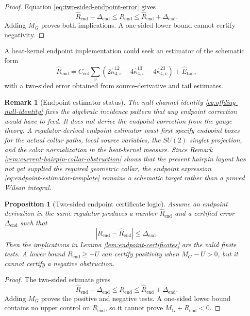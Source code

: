 \documentclass[11pt]{article}
\newtheorem{proposition}[theorem]{Proposition}
\newtheorem{remark}[theorem]{Remark}
\begin{document}
\begin{proof}
Equation \eqref{eq:two-sided-endpoint-error} gives
\[
  \widehat R_{\mathrm{end}}-\Delta_{\mathrm{end}}
  \le R_{\mathrm{end}}
  \le\widehat R_{\mathrm{end}}+\Delta_{\mathrm{end}}.
\]
Adding $M_G$ proves both implications.  A one-sided lower bound cannot certify negativity.
\end{proof}

A heat-kernel endpoint implementation could seek an estimator of the schematic form
\begin{equation}
  \widehat R_{\mathrm{end}}
  =C_{\mathrm{col}}
  \sum_v\left(
  2\widehat\kappa_{4,v}^{12}
  -4\widehat\kappa_{4,v}^{13}
  -4\widehat\kappa_{4,v}^{23}
  \right)
  +\widehat E_{\mathrm{tail}},
  \label{eq:endpoint-estimator-template}
\end{equation}
with a two-sided error obtained from source-derivative and tail estimates.

\begin{remark}[Endpoint estimator status]
\label{rem:endpoint-estimator-status}
The null-channel identity \eqref{eq:offdiag-null-identity} fixes the algebraic incidence pattern that any endpoint correction would have to feed.  It does not derive the endpoint correction from the gauge theory.  A regulator-derived endpoint estimator must first specify endpoint boxes for the actual collar paths, local source variables, the \(SU(2)\) singlet projection, and the color normalization in the heat-kernel measure.  Since Remark \ref{rem:current-hairpin-collar-obstruction} shows that the present hairpin layout has not yet supplied the required geometric collar, the endpoint expression \eqref{eq:endpoint-estimator-template} remains a schematic target rather than a proved Wilson integral.
\end{remark}

\begin{proposition}[Two-sided endpoint certificate logic]
\label{prop:two-sided-endpoint-logic}
Assume an endpoint derivation in the same regulator produces a number \(\widehat R_{\mathrm{end}}\) and a certified error \(\Delta_{\mathrm{end}}\) such that
\[
  |R_{\mathrm{end}}-\widehat R_{\mathrm{end}}|
  \le \Delta_{\mathrm{end}}.
\]
Then the implications in Lemma \ref{lem:endpoint-certificates} are the valid finite tests.  A lower bound \(R_{\mathrm{end}}\ge -U\) can certify positivity when \(M_G-U>0\), but it cannot certify a negative obstruction.
\end{proposition}

\begin{proof}
The two-sided estimate gives
\[
  \widehat R_{\mathrm{end}}-\Delta_{\mathrm{end}}
  \le R_{\mathrm{end}}
  \le \widehat R_{\mathrm{end}}+\Delta_{\mathrm{end}}.
\]
Adding \(M_G\) proves the positive and negative tests.  A one-sided lower bound contains no upper control on \(R_{\mathrm{end}}\), so it cannot prove \(M_G+R_{\mathrm{end}}<0\).
\end{proof}
\end{document}
